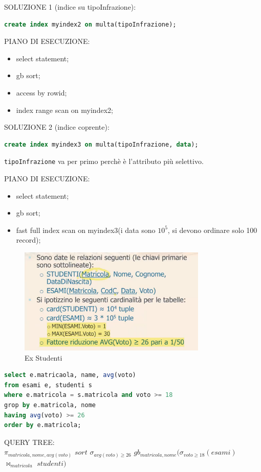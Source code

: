 \documentclass[12pt]{article}
\begin{document}
\begin{example}{}{}
    SOLUZIONE 1 (indice su tipoInfrazione):
\begin{lstlisting}[language=sql]
create index myindex2 on multa(tipoInfrazione);
\end{lstlisting}
    PIANO DI ESECUZIONE:
    \begin{itemize}
        \item select statement;
        \item gb sort;
        \item access by rowid;
        \item index range scan on myindex2;
    \end{itemize}

    SOLUZIONE 2 (indice coprente):
\begin{lstlisting}[language=sql]
create index myindex3 on multa(tipoInfrazione, data);
\end{lstlisting}
    \texttt{tipoInfrazione} va per primo perch\`e \`e l'attributo pi\`u selettivo.
    
    PIANO DI ESECUZIONE:
    \begin{itemize}
        \item select statement;
        \item gb sort;
        \item fast full index scan on myindex3(i data sono $10^{5}$, si devono ordinare solo 100 record);
    \end{itemize}
\end{example}



\begin{example}{}{}
    \begin{figure}[H]
        \centering
        \includegraphics[width=0.8\textwidth]{ex-studenti.png}
        \caption{Ex Studenti}
        \label{fig:ex-studenti}
    \end{figure}

\begin{lstlisting}[language=sql]
select e.matricaola, name, avg(voto)
from esami e, studenti s
where e.matricola = s.matricola and voto >= 18
grop by e.matricola, nome
having avg(voto) >= 26
order by e.matricola;
\end{lstlisting}
    
   QUERY TREE: \\
   $\pi_{matricola,nome,avg(voto)}$ $sort$ $\sigma_{avg(voto) \geqslant  26} $  $ gb_{matricola,nome} ( \sigma_{voto \geqslant 18}(esami)$ $\bowtie_{matricola}$ $studenti )$
\end{example}
\end{document}
